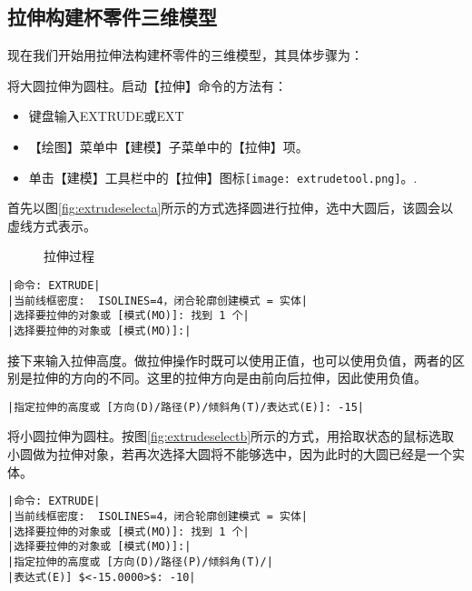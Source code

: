 \subsection{拉伸构建杯零件三维模型}
现在我们开始用拉伸法构建杯零件的三维模型，其具体步骤为：
\begin{procedure}
\item 将大圆拉伸为圆柱。启动【拉伸】命令的方法有：
\begin{itemize}
\item 键盘输入EXTRUDE或EXT
\item 【绘图】菜单中【建模】子菜单中的【拉伸】项。
\item 单击【建模】工具栏中的【拉伸】图标\texttt{[image: extrudetool.png]}。.
\end{itemize}
首先以图\ref{fig:extrudeselecta}所示的方式选择圆进行拉伸，选中大圆后，该圆会以虚线方式表示。
\begin{figure}[htbp]
\centering
{}\hspace{20pt}
\caption{拉伸过程}
\end{figure}
\begin{lstlisting}
|命令: EXTRUDE|
|当前线框密度:  ISOLINES=4，闭合轮廓创建模式 = 实体|
|选择要拉伸的对象或 [模式(MO)]: 找到 1 个|
|选择要拉伸的对象或 [模式(MO)]:|
\end{lstlisting}
接下来输入拉伸高度。做拉伸操作时既可以使用正值，也可以使用负值，两者的区别是拉伸的方向的不同。这里的拉伸方向是由前向后拉伸，因此使用负值。
\begin{lstlisting}
|指定拉伸的高度或 [方向(D)/路径(P)/倾斜角(T)/表达式(E)]: -15|
\end{lstlisting}
\item 将小圆拉伸为圆柱。按图\ref{fig:extrudeselectb}所示的方式，用拾取状态的鼠标选取小圆做为拉伸对象，若再次选择大圆将不能够选中，因为此时的大圆已经是一个实体。
\begin{lstlisting}
|命令: EXTRUDE|
|当前线框密度:  ISOLINES=4，闭合轮廓创建模式 = 实体|
|选择要拉伸的对象或 [模式(MO)]: 找到 1 个|
|选择要拉伸的对象或 [模式(MO)]:|
|指定拉伸的高度或 [方向(D)/路径(P)/倾斜角(T)/|
|表达式(E)] $<-15.0000>$: -10|
\end{lstlisting}


\end{procedure}
